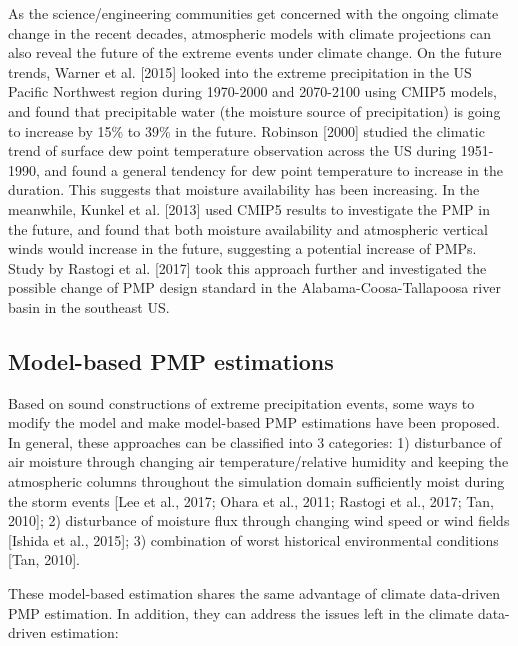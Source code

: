 As the science/engineering communities get concerned with the ongoing climate change in the recent decades, atmospheric models with climate projections can also reveal the future of the extreme events under climate change. On the future trends, Warner et al. [2015] looked into the extreme precipitation in the US Pacific Northwest region during 1970-2000 and 2070-2100 using CMIP5 models, and found that precipitable water (the moisture source of precipitation) is going to increase by 15\% to 39\% in the future. Robinson [2000] studied the climatic trend of surface dew point temperature observation across the US during 1951-1990, and found a general tendency for dew point temperature to increase in the duration. This suggests that moisture availability has been increasing. In the meanwhile, Kunkel et al. [2013] used CMIP5 results to investigate the PMP in the future, and found that both moisture availability and atmospheric vertical winds would increase in the future, suggesting a potential increase of PMPs. Study by Rastogi et al. [2017]  took this approach further and investigated the possible change of PMP design standard in the Alabama-Coosa-Tallapoosa river basin in the southeast US.

\subsection{Model-based PMP estimations}

Based on sound constructions of extreme precipitation events, some ways to modify the model and make model-based PMP estimations have been proposed. In general, these approaches can be classified into 3 categories: 1) disturbance of air moisture through changing air temperature/relative humidity and keeping the atmospheric columns throughout the simulation domain sufficiently moist during the storm events [Lee et al., 2017; Ohara et al., 2011; Rastogi et al., 2017; Tan, 2010]; 2) disturbance of moisture flux through changing wind speed or wind fields [Ishida et al., 2015]; 3) combination of worst historical environmental conditions [Tan, 2010].

These model-based estimation shares the same advantage of climate data-driven PMP estimation. In addition, they can address the issues left in the climate data-driven estimation:

